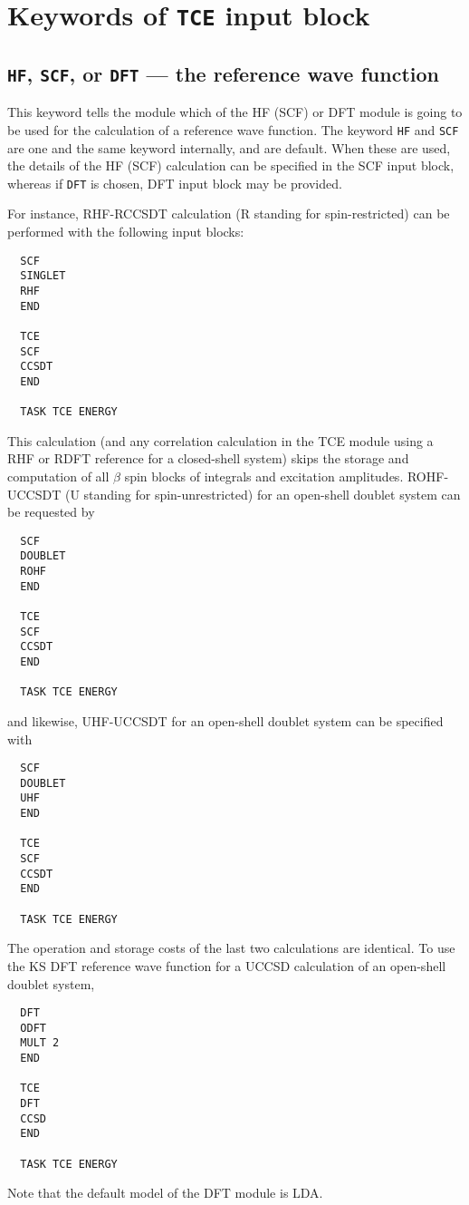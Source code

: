 \section{Keywords of {\tt TCE} input block}

\subsection{{\tt HF}, {\tt SCF}, or {\tt DFT} --- the reference wave function}

This keyword tells the module
which of the HF (SCF) or DFT module is going to be used for the calculation
of a reference wave function.  The keyword \verb+HF+ and \verb+SCF+ are
one and the same keyword internally, and are default.  When these are used,
the details of the HF (SCF) calculation can be specified in the SCF input
block, whereas if \verb+DFT+ is chosen, DFT input block may be provided.

For instance, RHF-RCCSDT calculation (R standing for spin-restricted) 
can be performed with the following input blocks:
\begin{verbatim}
  SCF
  SINGLET
  RHF
  END

  TCE
  SCF
  CCSDT
  END

  TASK TCE ENERGY
\end{verbatim}
This calculation (and any correlation calculation in the TCE module using a RHF or RDFT
reference for a closed-shell system) skips the storage and computation of all $\beta$ spin
blocks of integrals and excitation amplitudes.  ROHF-UCCSDT (U standing for spin-unrestricted)
for an open-shell doublet system can be requested by
\begin{verbatim}
  SCF
  DOUBLET
  ROHF
  END

  TCE
  SCF
  CCSDT
  END

  TASK TCE ENERGY
\end{verbatim}
and likewise, UHF-UCCSDT for an open-shell doublet system can be specified with
\begin{verbatim}
  SCF
  DOUBLET
  UHF
  END

  TCE
  SCF
  CCSDT
  END

  TASK TCE ENERGY
\end{verbatim}
The operation and storage costs of the last two calculations are identical.  To use the
KS DFT reference wave function for a UCCSD calculation of an open-shell doublet system,
\begin{verbatim}
  DFT
  ODFT
  MULT 2
  END

  TCE
  DFT
  CCSD
  END

  TASK TCE ENERGY
\end{verbatim}
Note that the default model of the DFT module is LDA.

